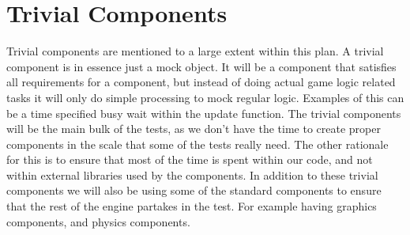 \section{Trivial Components}
Trivial components are mentioned to a large extent within this plan.
A trivial component is in essence just a mock object.
It will be a component that satisfies all requirements for a component, 
but instead of doing actual game logic related tasks it will only do simple processing to mock regular logic.
Examples of this can be a time specified busy wait within the update function.
The trivial components will be the main bulk of the tests, 
as we don't have the time to create proper components in the scale that some of the tests really need.
The other rationale for this is to ensure that most of the time is spent within our code, and not within external libraries used by the components.
In addition to these trivial components we will also be using some of the standard components to ensure that the rest of the engine partakes in the test. 
For example having graphics components, and physics components.

